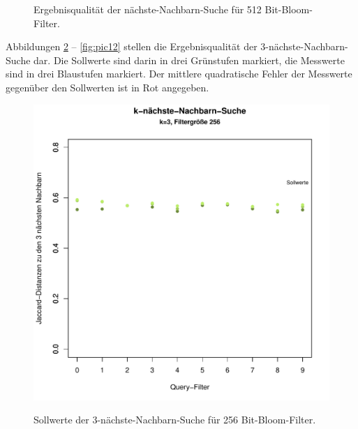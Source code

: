 \begin{figure}[hpbt]
  	\caption[Ergebnisqualität der nächste-Nachbarn-Suche für 256 Bit-Bloom-Filter]{Ergebnisqualität der nächste-Nachbarn-Suche für 512 Bit-Bloom-Filter.}\label{fig:pic8}
\end{figure}

Abbildungen \ref{fig:pic9} -- \ref{fig:pic12} stellen die Ergebnisqualität der 3-nächste-Nachbarn-Suche dar. Die Sollwerte sind darin in drei Grünstufen markiert, die Messwerte sind in drei Blaustufen markiert. Der mittlere quadratische Fehler der Messwerte gegenüber den Sollwerten ist in Rot angegeben.
\begin{figure}
	\centering
	\includegraphics[scale=0.7]{pictures/nn3_256-1.pdf}\\
	\caption[Sollwerte der 3-nächste-Nachbarn-Suche für 256 Bit-Bloom-Filter]{Sollwerte der 3-nächste-Nachbarn-Suche für 256 Bit-Bloom-Filter.}\label{fig:pic9}

\end{figure}
